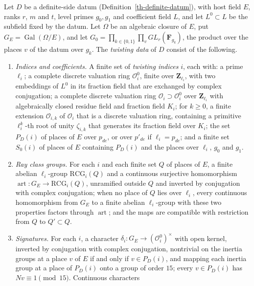 \begin{definition}\label{th-twisting-data}
Let $D$ be a definite-side datum (Definition~\ref{th-definite-datum}), with host
field $E$, ranks $r$, $m$ and $t$, level primes $g_0,g_1$ and coefficient field
$L$, and let $L^0\subset L$ be the subfield fixed by the datum. Let $\Omega$ be
an algebraic closure of $E$, put $G_E=\operatorname{Gal}(\Omega/E)$, and let
$G_0=\prod_{k\in\{0,1\}}\prod_vGL_r(\mathbf F_{g_k})$, the product over the
places $v$ of the datum over $g_k$. The \emph{twisting data} of $D$ consist of
the following.
\begin{enumerate}
\item \emph{Indices and coefficients.} A finite set of \emph{twisting indices}
  $i$, each with: a prime $\ell_i$; a complete discrete valuation ring
  $\mathcal O^0_i$, finite over $\mathbf Z_{\ell_i}$, with two embeddings of
  $L^0$ in its fraction field that are exchanged by complex conjugation; a
  complete discrete valuation ring $\mathcal O_i\supset\mathcal O^0_i$ over
  $\mathbf Z_{\ell_i}$ with algebraically closed residue field and fraction
  field $K_i$; for $k\geq0$, a finite extension $\mathcal O_{i,k}$ of
  $\mathcal O_i$ that is a discrete valuation ring, containing a primitive
  $\ell_i^k$-th root of unity $\zeta_{i,k}$ that generates its fraction field
  over $K_i$; the set $P_D(i)$ of places of $E$ over $p_{de}$, or over
  $p'_{de}$ if $\ell_i=p_{de}$; and a finite set $S_0(i)$ of places of $E$
  containing $P_D(i)$ and the places over $\ell_i$, $g_0$ and $g_1$.
\item \emph{Ray class groups.} For each $i$ and each finite set $Q$ of places
  of $E$, a finite abelian $\ell_i$-group $\mathrm{RCG}_i(Q)$ and a continuous
  surjective homomorphism $\operatorname{art}\colon G_E\to\mathrm{RCG}_i(Q)$,
  unramified outside $Q$ and inverted by conjugation with complex conjugation;
  when no place of $Q$ lies over $\ell_i$, every continuous homomorphism from
  $G_E$ to a finite abelian $\ell_i$-group with these two properties factors
  through $\operatorname{art}$; and the maps are compatible with restriction
  from $Q$ to $Q'\subset Q$.
\item \emph{Signatures.} For each $i$, a character
  $\delta_i\colon G_E\to(\mathcal O^0_i)^\times$ with open kernel, inverted by
  conjugation with complex conjugation, nontrivial on the inertia groups at a
  place $v$ of $E$ if and only if $v\in P_D(i)$, and mapping each inertia group
  at a place of $P_D(i)$ onto a group of order $15$; every $v\in P_D(i)$ has
  $Nv\equiv1\pmod{15}$. Continuous characters

\end{enumerate}
\end{definition}
